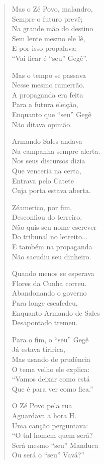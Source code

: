 \begin{verse}
Mas o Zé Povo, malandro,\\
Sempre o futuro prevê;\\
Na grande mão do destino\\
Sem lente mesmo ele lê,\\
E por isso propalava:\\
“Vai ficar é “seu” Gegê”.

Mas o tempo se passava\\
Nesse mesmo ramerrão.\\
A propaganda era feita\\
Para a futura eleição,\\
Enquanto que “seu” Gegê\\
Não ditava opinião.

Armando Sales andava\\
Na campanha sempre alerta.\\
Nos seus discursos dizia\\
Que venceria na certa,\\
Entrava pelo Catete\\
Cuja porta estava aberta.

Zéamerico, por fim,\\
Desconfiou do terreiro.\\
Não quis seu nome escrever\\
Do tribunal no letreito...\\
E também na propaganda\\
Não sacudiu seu dinheiro.
\pagebreak

Quando menos se esperava\\
Flores da Cunha correu.\\
Abandonando o governo\\
Para longe escafedeu,\\
Enquanto Armando de Sales\\
Desapontado tremeu.

Para o fim, o “seu” Gegê\\
Já estava tiririca,\\
Mas usando de prudência\\
O tema velho ele explica:\\
“Vamos deixar como está\\
Que é para ver como fica.”

O Zé Povo pela rua\\
Aguardava a hora H.\\
Uma canção perguntava:\\
“O tal homem quem será?\\
Será mesmo “seu” Manduca\\
Ou será o “seu” Vavá?”


\end{verse}
